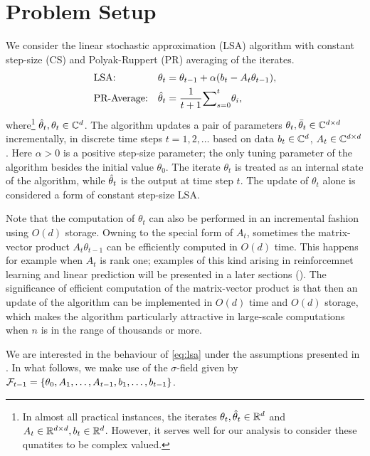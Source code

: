 \section{Problem Setup}
We consider the linear stochastic approximation (LSA) algorithm with constant step-size (CS) and Polyak-Ruppert (PR) averaging of the iterates.
\begin{subequations}\label{eq:lsa}
\begin{align}
\label{conststep}&\text{LSA:} &\theta_t&=\theta_{t-1}+\alpha(b_t-A_t\theta_{t-1}),\\
\label{iteravg}&\text{PR-Average:} &\hat{\theta}_t&=\frac{1}{t+1}{\sum}_{s=0}^{t}\theta_i,
\end{align}
\end{subequations}
where\footnote{In almost all practical instances, the iterates $\theta_t,\hat{\theta}_t\in \mathbb{R}^d$ and $A_t\in \mathbb{R}^{d \times d}, b_t\in \mathbb{R}^d$. However, it serves well for our analysis to consider these qunatites to be complex valued.} $\hat{\theta}_t, \theta_t \in \mathbb{C}^{d}$. The algorithm updates a pair of parameters $\theta_t,\bar{\theta}_t\in \mathbb{C}^{d \times d}$ incrementally, in discrete time steps $t=1,2,\dots$
based on data $b_t\in \mathbb{C}^d$, $A_t\in \mathbb{C}^{d \times d}$. Here $\alpha>0$ is a positive step-size parameter; the only tuning parameter of the algorithm besides the
initial value $\theta_0$. The iterate $\theta_t$ is treated as an internal state of the algorithm, while $\hat{\theta}_t$ is the output at time step $t$. The update of $\theta_t$ alone is considered a form of constant step-size LSA.\par
Note that the computation of $\theta_t$ can also be performed in an incremental fashion using $O(d)$ storage. Owning to the special form of $A_t$, sometimes the matrix-vector product $A_t \theta_{t-1}$ can be efficiently computed in $O(d)$ time. This happens for example when $A_t$ is rank one; examples of this kind arising in reinforcemnet learning \cite{} and linear prediction \cite{} will be presented in a later sections (). The significance of efficient computation of the matrix-vector product is that then an update of the algorithm
can be implemented in $O(d)$ time and $O(d)$ storage, which makes the algorithm particularly attractive in large-scale computations when $n$ is in the range of thousands or more.\par
We are interested in the behaviour of \eqref{eq:lsa} under the assumptions presented in . In what follows, we make use of the $\sigma$-field given by $\mathcal{F}_{t-1}=\{\theta_0,A_1,\ldots, A_{t-1}, b_1,\ldots, b_{t-1}\}$.

